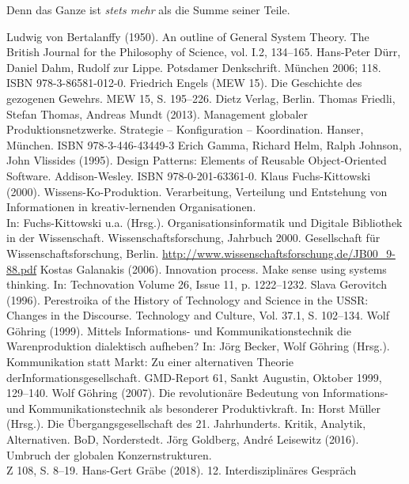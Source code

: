 \documentclass[11pt,a4paper]{article}
\begin{document}
Denn das Ganze ist \emph{stets mehr} als die Summe seiner Teile.

\begin{thebibliography}{xxx}
 Ludwig von Bertalanffy (1950). An outline of General
  System Theory. The British Journal for the Philosophy of Science, vol. I.2,
  134–165.
 Hans-Peter Dürr, Daniel Dahm, Rudolf zur Lippe. Potsdamer
  Denkschrift.  München 2006; 118. ISBN 978-3-86581-012-0.
 Friedrich Engels (MEW 15). Die Geschichte des gezogenen
  Gewehrs.  MEW 15, S. 195--226. Dietz Verlag, Berlin.
 Thomas Friedli, Stefan Thomas, Andreas Mundt (2013).
  Management globaler Produktionsnetzwerke. Strategie – Konfiguration –
  Koordination. Hanser, München. ISBN 978-3-446-43449-3
 Erich Gamma, Richard Helm, Ralph Johnson, John Vlissides
  (1995). Design Patterns: Elements of Reusable Object-Oriented Software.
  Addison-Wesley. ISBN 978-0-201-63361-0.
 Klaus Fuchs-Kittowski (2000).  Wissens-Ko-Produktion.
  Verarbeitung, Verteilung und Entstehung von Informationen in
  kreativ-lernenden Organisationen.\\ In: Fuchs-Kittowski u.a.
  (Hrsg.). Organisationsinformatik und Digitale Bibliothek in der
  Wissenschaft. Wissenschaftsforschung, Jahrbuch 2000. Gesellschaft für
  Wissenschaftsforschung, Berlin.
  \url{http://www.wissenschaftsforschung.de/JB00_9-88.pdf}
 Kostas Galanakis (2006).  Innovation process. Make
  sense using systems thinking.  In: Technovation Volume 26, Issue 11,
  p. 1222--1232.
 Slava Gerovitch (1996). Perestroika of the History of
  Technology and Science in the USSR: Changes in the Discourse. Technology and
  Culture, Vol. 37.1, S. 102--134.
 Wolf Göhring (1999).  Mittels Informations- und
  Kommunikationstechnik die Warenproduktion dialektisch aufheben? In: Jörg
  Becker, Wolf Göhring (Hrsg.).  Kommunikation statt Markt: Zu einer
  alternativen Theorie derInformationsgesellschaft.  GMD-Report 61, Sankt
  Augustin, Oktober 1999, 129–140.
 Wolf Göhring (2007). Die revolutionäre Bedeutung von
  Informations- und Kommunikationstechnik als besonderer Produktivkraft. In:
  Horst Müller (Hrsg.).  Die Übergangsgesellschaft des 21. Jahrhunderts.
  Kritik, Analytik, Alternativen.  BoD, Norderstedt.
 Jörg Goldberg, André Leisewitz (2016). Umbruch der
  globalen Konzernstrukturen.\\ Z 108, S. 8--19.
 Hans-Gert Gräbe (2018).  12. Interdisziplinäres Gespräch

\end{thebibliography}
\end{document}
